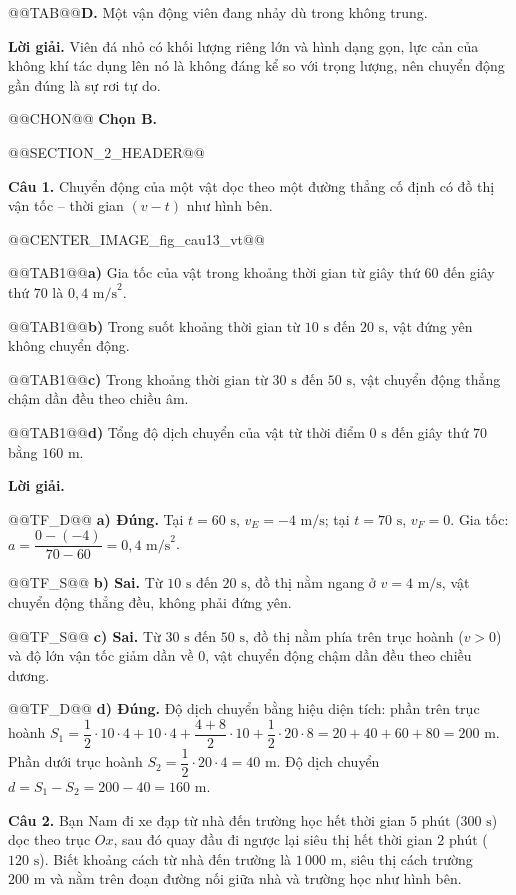 \documentclass{article}
\begin{document}
@@TAB@@\textbf{D.} Một vận động viên đang nhảy dù trong không trung.

\textbf{Lời giải.} Viên đá nhỏ có khối lượng riêng lớn và hình dạng gọn, lực cản của không khí tác dụng lên nó là không đáng kể so với trọng lượng, nên chuyển động gần đúng là sự rơi tự do.

@@CHON@@ \textbf{Chọn B.}

@@SECTION_2_HEADER@@

\textbf{Câu 1.} Chuyển động của một vật dọc theo một đường thẳng cố định có đồ thị vận tốc -- thời gian $(v - t)$ như hình bên.

@@CENTER_IMAGE_fig_cau13_vt@@

@@TAB1@@\textbf{a)} Gia tốc của vật trong khoảng thời gian từ giây thứ $60$ đến giây thứ $70$ là $0{,}4\text{ m/s}^2$.

@@TAB1@@\textbf{b)} Trong suốt khoảng thời gian từ $10\text{ s}$ đến $20\text{ s}$, vật đứng yên không chuyển động.

@@TAB1@@\textbf{c)} Trong khoảng thời gian từ $30\text{ s}$ đến $50\text{ s}$, vật chuyển động thẳng chậm dần đều theo chiều âm.

@@TAB1@@\textbf{d)} Tổng độ dịch chuyển của vật từ thời điểm $0\text{ s}$ đến giây thứ $70$ bằng $160\text{ m}$.

\textbf{Lời giải.}

@@TF_D@@ \textbf{a) Đúng.} Tại $t = 60\text{ s}$, $v_E = -4\text{ m/s}$; tại $t = 70\text{ s}$, $v_F = 0$. Gia tốc: $a = \dfrac{0 - (-4)}{70 - 60} = 0{,}4\text{ m/s}^2$.

@@TF_S@@ \textbf{b) Sai.} Từ $10\text{ s}$ đến $20\text{ s}$, đồ thị nằm ngang ở $v = 4\text{ m/s}$, vật chuyển động thẳng đều, không phải đứng yên.

@@TF_S@@ \textbf{c) Sai.} Từ $30\text{ s}$ đến $50\text{ s}$, đồ thị nằm phía trên trục hoành ($v > 0$) và độ lớn vận tốc giảm dần về $0$, vật chuyển động chậm dần đều theo chiều dương.

@@TF_D@@ \textbf{d) Đúng.} Độ dịch chuyển bằng hiệu diện tích: phần trên trục hoành $S_1 = \dfrac{1}{2} \cdot 10 \cdot 4 + 10 \cdot 4 + \dfrac{4+8}{2} \cdot 10 + \dfrac{1}{2} \cdot 20 \cdot 8 = 20 + 40 + 60 + 80 = 200\text{ m}$. Phần dưới trục hoành $S_2 = \dfrac{1}{2} \cdot 20 \cdot 4 = 40\text{ m}$. Độ dịch chuyển $d = S_1 - S_2 = 200 - 40 = 160\text{ m}$.

\textbf{Câu 2.} Bạn Nam đi xe đạp từ nhà đến trường học hết thời gian $5\text{ phút}$ ($300\text{ s}$) dọc theo trục $Ox$, sau đó quay đầu đi ngược lại siêu thị hết thời gian $2\text{ phút}$ ($120\text{ s}$). Biết khoảng cách từ nhà đến trường là $1\,000\text{ m}$, siêu thị cách trường $200\text{ m}$ và nằm trên đoạn đường nối giữa nhà và trường học như hình bên.
\end{document}
